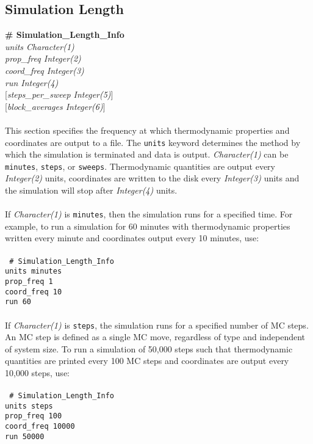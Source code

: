 \subsection{Simulation Length}\label{sec:Simulation_Length_Info}
{\bf \# Simulation\_Length\_Info} \\
{\it units  Character(1)} \\
{\it prop\_freq  Integer(2)} \\
{\it coord\_freq  Integer(3)} \\
{\it run  Integer(4)} \\ 
{[}{\it steps\_per\_sweep  Integer(5)}] \\
{[}{\it block\_averages  Integer(6)}] \\ \\
%
This section specifies the frequency at which thermodynamic properties and coordinates are output to a file. 
The \texttt{units} keyword determines the method by which the simulation is terminated and data is output. 
{\it Character(1)} can be {\tt minutes}, {\tt steps}, or {\tt sweeps}. 
Thermodynamic quantities are output every {\it Integer(2)} units,
coordinates are written to the disk every {\it Integer(3)} units and 
the simulation will stop after {\it Integer(4)} units. \\ \\
%
If {\it Character(1)} is {\tt minutes}, then the simulation runs for a specified time.
For example, to run a simulation for 60 minutes with thermodynamic properties written every minute and 
coordinates output every 10 minutes, use: \\ \\
%
\texttt{
\# Simulation\_Length\_Info \\
units         minutes \\
prop\_freq    1 \\
coord\_freq   10 \\
run           60 \\} \\
%
If {\it Character(1)} is {\tt steps}, the simulation runs for a specified number of MC steps.
An MC step is defined as a single MC move, regardless of type and independent of system size. 
To run a simulation of 50,000 steps such that thermodynamic quantities are printed every 100 MC steps and 
coordinates are output every 10,000 steps, use: \\ \\
%
\texttt{
\# Simulation\_Length\_Info \\
units           steps \\
prop\_freq      100 \\
coord\_freq     10000 \\
run             50000 \\ } \\
